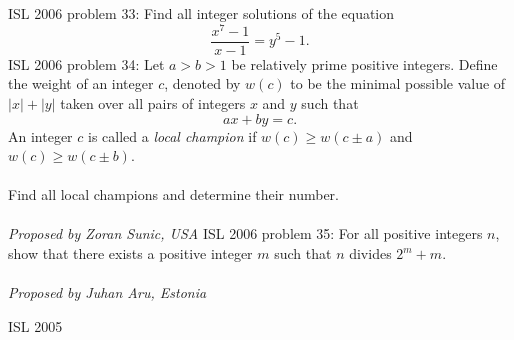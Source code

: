 ISL 2006 problem 33:  Find all integer solutions of the equation
\[ \frac {x^7 - 1}{x - 1} = y^5 - 1. \] 
ISL 2006 problem 34:  Let $ a > b > 1$ be relatively prime positive integers. Define the weight of an integer $ c$, denoted by $ w(c)$ to be the minimal possible value of $ |x| + |y|$ taken over all pairs of integers $ x$ and $ y$ such that
\[ ax + by = c. \]
An integer $ c$ is called a \textit{local champion }if $ w(c) \geq w(c \pm a)$ and $ w(c) \geq w(c \pm b)$. \\\\
Find all local champions and determine their number. \\\\
\textit{Proposed by Zoran Sunic, USA} 
ISL 2006 problem 35:  For all positive integers $n$, show that there exists a positive integer $m$ such that $n$ divides $2^m + m$. \\\\
\textit{Proposed by Juhan Aru, Estonia} 

ISL 2005 

